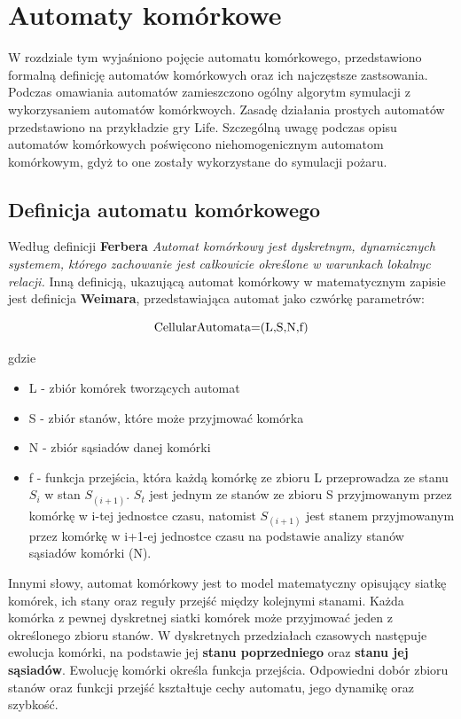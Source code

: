 ﻿%
\chapter{Automaty komórkowe}
\label{cha:Automaty komórkowe}
W rozdziale tym wyjaśniono pojęcie automatu komórkowego, przedstawiono formalną definicję automatów komórkowych oraz ich najczęstsze  zastsowania. Podczas omawiania automatów zamieszczono ogólny algorytm symulacji z wykorzysaniem automatów komórkwoych. Zasadę działania prostych automatów przedstawiono
na przykładzie gry Life. Szczególną uwagę podczas opisu 
 automatów komórkowych poświęcono niehomogenicznym automatom komórkowym, gdyż to one zostały wykorzystane
do symulacji pożaru. 
\section {Definicja automatu komórkowego}
Według definicji \textbf {Ferbera} \textsl{ Automat komórkowy jest dyskretnym, dynamicznych systemem, którego zachowanie jest
całkowicie określone w warunkach lokalnyc relacji.}
Inną definicją, ukazującą automat komórkowy w matematycznym zapisie jest definicja \textbf{Weimara}, przedstawiająca
automat jako czwórkę parametrów:
\begin{Center}
\begin {equation}
\label{def_automatu}
$CellularAutomata=(L,S,N,f)$
\end {equation}
\end{Center}
gdzie
\begin{itemize}
\item L - zbiór komórek tworzących automat
\item S - zbiór stanów, które może przyjmować komórka
\item N - zbiór sąsiadów danej komórki
\item f - funkcja przejścia, która każdą komórkę ze zbioru L przeprowadza  ze stanu $S_i$ w stan $S_(i+1)$. $S_t$ jest jednym ze stanów
		ze zbioru S przyjmowanym przez komórkę w i-tej jednostce czasu, natomist $S_(i+1)$ jest stanem przyjmowanym
		przez komórkę w i+1-ej jednostce czasu na podstawie analizy stanów sąsiadów komórki (N).
\end{itemize}
Innymi słowy, automat komórkowy jest to model matematyczny opisujący siatkę komórek, ich stany oraz reguły przejść
między kolejnymi stanami. Każda komórka z pewnej dyskretnej siatki komórek może przyjmować jeden z określonego zbioru stanów.
W dyskretnych przedziałach czasowych następuje ewolucja komórki, na podstawie jej \textbf{stanu poprzedniego} oraz \textbf{stanu jej sąsiadów}. Ewolucję komórki określa funkcja przejścia. Odpowiedni dobór zbioru stanów oraz funkcji przejść kształtuje cechy automatu, jego dynamikę oraz szybkość.
